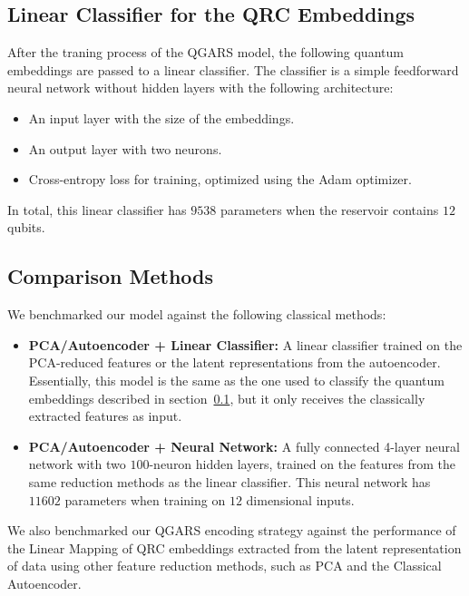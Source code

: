 \documentclass[conference]{IEEEtran}
\begin{document}
\subsection{Linear Classifier for the QRC Embeddings} \label{linear_classifier_for_the_qrc_embeddings}
After the traning process of the QGARS model,
the following quantum embeddings are passed to a linear classifier.
The classifier is a simple feedforward neural network without hidden layers with the following architecture:
\begin{itemize}
    \item An input layer with the size of the embeddings.
    \item An output layer with two neurons.
    \item Cross-entropy loss for training, optimized using the Adam optimizer.
\end{itemize}
In total, this linear classifier has \(9538\) parameters when the reservoir contains $12$ qubits.

\subsection{Comparison Methods}
We benchmarked our model against the following classical methods:
\begin{itemize}
    \item \textbf{PCA/Autoencoder + Linear Classifier:} 
    A linear classifier trained on the PCA-reduced features or the latent representations from the autoencoder. Essentially, this model is the same as the one used to classify the quantum embeddings described in section~\ref{linear_classifier_for_the_qrc_embeddings}, but it only receives the classically extracted features as input. 
    
    \item \textbf{PCA/Autoencoder + Neural Network:}
    A fully connected 4-layer neural network with two $100$-neuron hidden layers, trained on the features from the same reduction methods as the linear classifier. This neural network has $11602$ parameters when training on $12$ dimensional inputs.
\end{itemize}

We also benchmarked our QGARS encoding strategy
against the performance of the Linear Mapping of
QRC embeddings extracted from the latent representation 
of data using other feature reduction methods, such as
PCA and the Classical Autoencoder.

\end{document}

